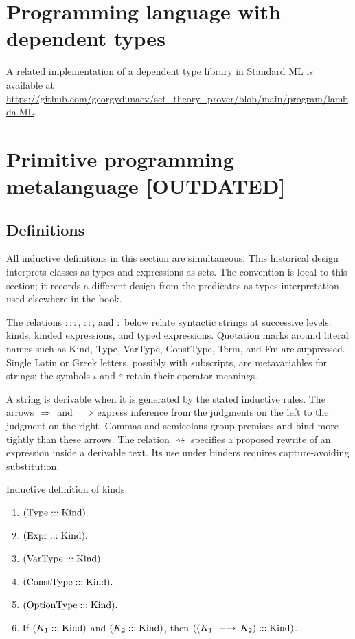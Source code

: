 \def\topic{languages}

\section{Programming language with dependent types}
A related implementation of a dependent type library in Standard ML is
available at \url{https://github.com/georgydunaev/set_theory_prover/blob/main/program/lambda.ML}.

\section{Primitive programming metalanguage [OUTDATED]}
\subsection{Definitions}
All inductive definitions in this section are simultaneous.
This historical design interprets classes as types and expressions as sets.
The convention is local to this section; it records a different design
from the predicates-as-types interpretation used elsewhere in the book.
\begin{notation}
The relations $:::$, $::$, and $:$ below relate syntactic strings at
successive levels: kinds, kinded expressions, and typed expressions.
Quotation marks around literal names such as Kind, Type, VarType,
ConstType, Term, and Fm are suppressed. Single Latin or Greek letters,
possibly with subscripts, are metavariables for strings; the symbols
$\iota$ and $\varepsilon$ retain their operator meanings.

A string is derivable when it is generated by the stated inductive rules.
The arrows $\ \Rightarrow\ $ and $=\Rightarrow$ express inference from the judgments
on the left to the judgment on the right. Commas and semicolons group
premises and bind more tightly than these arrows. The relation
$\rightsquigarrow$ specifies a proposed rewrite of an expression inside a
derivable text. Its use under binders requires capture-avoiding substitution.
\end{notation}
\begin{definition}[$\Kind$]
Inductive definition of kinds:
\begin{enumerate}
\item $(\mathrm{Type}:::\mathrm{Kind}).$
\item $(\mathrm{Expr}:::\mathrm{Kind}).$
\item $(\mathrm{VarType}:::\mathrm{Kind}).$
\item $(\mathrm{ConstType}:::\mathrm{Kind}).$
\item $(\mathrm{OptionType}:::\mathrm{Kind}).$
\item If $(K_1:::\mathrm{Kind})$ and $(K_2:::\mathrm{Kind})$, then $((K_1\ \mathrm{\mbox{-}-}\hspace{-1mm}\rightarrow\, K_2):::\mathrm{Kind})$.
\end{enumerate}
\end{definition}
